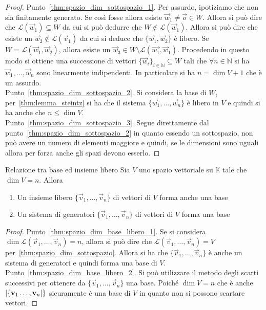 \begin{proof}
  Punto~\ref{thm:spazio_dim_sottospazio_1}. Per assurdo, ipotiziamo che non sia
  finitamente generato. Se così fosse allora esiste $\vec{w}_1\neq\vec{o}\in W$. Allora si
  può dire che $\mathscr{L}(\vec{w}_1)\subseteq W$ da cui si può dedurre che
  $W\notin\mathscr{L}(\vec{w}_1)$. Allora si può dire che esiste un
  $\vec{w}_2\notin\mathscr{L}(\vec{v}_1)$ da cui si deduce che $\{\vec{w}_1,\vec{w}_2\}$
  è libero. Se $W=\mathscr{L}(\vec{w}_1,\vec{w}_2)$, allora esiste un $\vec{w}_3\in
  W\setminus\mathscr{L}(\vec{w_1},\vec{w}_1)$. Procedendo in questo modo si ottiene una
  successione di vettori ${\{\vec{w}_i\}}_{i\in\mathbb{N}}\subseteq W$ tali che $\forall
  n\in\mathbb{N}$ si ha $\vec{w}_1,\ldots,\vec{w}_n$ sono linearmente indipendenti. In
  particolare si ha $n=\dim V+1$ che è un assurdo.\\
  Punto~\ref{thm:spazio_dim_sottospazio_2}. Si considera la base di $W$,
  per~\autoref{thm:lemma_steintz} si ha che il sistema $\{\vec{w}_1,\ldots,\vec{w}_n\}$
  è libero in $V$ e quindi si ha anche che $n\leq\dim V$.\\
  Punto~\ref{thm:spazio_dim_sottospazio_3}. Segue direttamente dal
  punto~\ref{thm:spazio_dim_sottospazio_2} in quanto essendo un sottospazio, non può
  avere un numero di elementi maggiore e quindi, se le dimensioni sono uguali allora per
  forza anche gli spazi devono esserlo.
\end{proof}

\begin{Thm}{Relazione tra base ed insieme libero}
  Sia $V$ uno spazio vettoriale su $\mathbb{K}$ tale che $\dim V=n$. Allora
  \begin{enumerate}
    \item\label{thm:spazio_dim_base_libero_1} Un insieme libero
      $\{\vec{v}_1,\ldots,\vec{v}_n\}$ di vettori di $V$ forma anche una base
    \item\label{thm:spazio_dim_base_libero_2} Un sistema di generatori
      $\{\vec{v}_1,\ldots,\vec{v}_n\}$ di vettori di $V$ forma una base
  \end{enumerate}
\end{Thm}

\begin{proof}
  Punto~\ref{thm:spazio_dim_base_libero_1}. Se si considera
  $\dim\mathscr{L}(\vec{v}_1,\ldots,\vec{v}_n)=n$, allora si può dire che
  $\mathscr{L}(\vec{v}_1,\ldots,\vec{v}_n)=V$ per~\autoref{thm:spazio_dim_sottospazio}.
  Allora si ha che $\{\vec{v}_1,\ldots,\vec{v}_n\}$ è anche un sistema di generatori e
  quindi forma una base di $V$.\\
  Punto~\ref{thm:spazio_dim_base_libero_2}. Si può utilizzare il metodo degli scarti
  successivi per ottenere da $\{\vec{v}_1,\ldots,\vec{v}_n\}$ una base. Poiché $\dim
  V=n$ che è anche $\abs{\{\mathbf{v}_1\ldots,\mathbf{v}_n}\}$ sicuramente è una base di $V$
  in quanto non si possono scartare vettori.
\end{proof}


